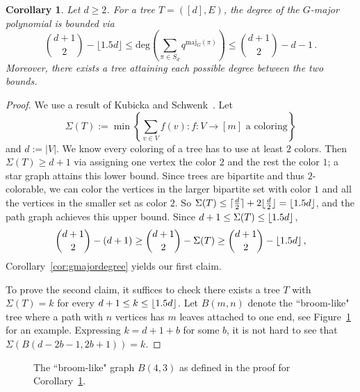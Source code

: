 \documentclass[11pt]{amsart}
\newtheorem{corollary}[theorem]{Corollary}
\newcommand{\vertex}{\node[vertex]}
\newcommand{\maj}{\mathrm{maj}}
\DeclarePairedDelimiter\ceil{\lceil}{\rceil}
\DeclarePairedDelimiter\floor{\lfloor}{\rfloor}
\begin{document}
\begin{corollary}\label{cor:treegmajordegree}
    Let $d \geq 2$. For a tree $T =([d],E)$, the degree of the $G$-major polynomial is bounded via
    \[
        \binom{d+1}{2} - \lfloor{1.5 d}\rfloor \leq 
        \mathrm{deg}\left(\sum_{\pi \in S_d} q^{\maj_G(\pi)}\right) \leq \binom{d+1}{2} - d -1 \, .
    \]
    Moreover, there exists a tree attaining each possible degree between the two bounds.
\end{corollary}
\begin{proof}
    We use a result of Kubicka and Schwenk~\cite[Theorem~3]{chromaticsums}.
    Let 
    \[
        \Sigma(T) := \min\left\{ \sum_{v \in V} f(v): f:V \to [m] \text{ a coloring} \right\}
    \]
    and $d := |V|$.
    We know every coloring of a tree has to use at least $2$ colors. 
    Then $\Sigma(T) \geq d+1$ via assigning one vertex the color $2$ and the rest the color $1$; a star graph attains this lower bound.
    Since trees are bipartite and thus $2$-colorable, we can color the vertices in the larger bipartite set with color $1$ and all the vertices in the smaller set as color $2$.
    So $\Sigma(T) \leq \ceil{\frac{d}{2}}+2 \floor{\frac{d}{2}} = \floor{1.5 d}$, and the path graph achieves this upper bound.
    Since $d+1 \leq \Sigma(T) \leq \floor{1.5 d}$,
    \[
        \binom{d+1}{2} - (d+1) \geq \binom{d+1}{2} - \Sigma(T) \geq \binom{d+1}{2} - \floor{1.5 d} \, ,
    \]
    Corollary~\ref{cor:gmajordegree} yields our first claim.
    
    To prove the second claim, it suffices to check there exists a tree $T$ with $\Sigma(T)=k$ for every $d+1 \leq k \leq \floor{1.5 d}$. 
    Let $B(m,n)$ denote the ``broom-like" tree where a path with $n$ vertices has $m$ leaves attached to one end, see Figure~\ref{fig:broomlikegraph} for an example. 
    Expressing $k=d+1+b$ for some $b$, it is not hard to
see that $\Sigma(B(d-2b-1,2b+1)) = k$.
\end{proof}

\begin{figure}
    \caption{The ``broom-like" graph $B(4,3)$ as defined in the proof for Corollary~\ref{cor:treegmajordegree}.}\label{fig:broomlikegraph}
\end{figure}
\end{document}
